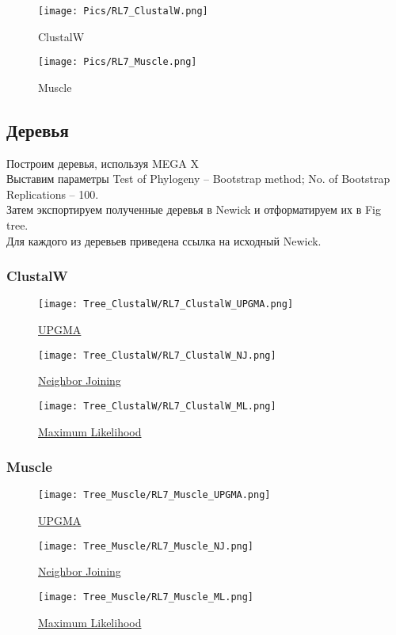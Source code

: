 \begin{figure}[!h]
	\texttt{[image: Pics/RL7\_ClustalW.png]}
	\caption{ClustalW}
\end{figure}

\begin{figure}[!h]
	\texttt{[image: Pics/RL7\_Muscle.png]}
	\caption{Muscle}
\end{figure}


\subsection*{Деревья}
Построим деревья, используя MEGA X\\
Выставим параметры Test of Phylogeny -- Bootstrap method; No. of Bootstrap Replications -- 100.\\
Затем экспортируем полученные деревья в Newick и отформатируем их в Fig tree.\\
Для каждого из деревьев приведена ссылка на исходный Newick.

\subsubsection*{ClustalW}
\begin{figure}[!h]
	\texttt{[image: Tree\_ClustalW/RL7\_ClustalW\_UPGMA.png]}
	\caption{\href{https://drive.google.com/file/d/1hPpDUa9uJmDLcnrepNsUhFL9HPq9cWZD/view?usp=sharing}{UPGMA}}
\end{figure}
\newpage
\begin{figure}[!h]
	\texttt{[image: Tree\_ClustalW/RL7\_ClustalW\_NJ.png]}
	\caption{\href{https://drive.google.com/file/d/1fIEN3s1rEiak2htmVUBiG3kB9EShOhEs/view?usp=sharing}{Neighbor Joining}}
\end{figure}
\begin{figure}[!h]
	\texttt{[image: Tree\_ClustalW/RL7\_ClustalW\_ML.png]}
	\caption{\href{https://drive.google.com/file/d/1OAH_Js0PMo2zVixTMYlEwZyR-ohE5Rn8/view?usp=sharing}{Maximum Likelihood}}
\end{figure}
\newpage
\subsubsection*{Muscle}

\begin{figure}[!h]
	\texttt{[image: Tree\_Muscle/RL7\_Muscle\_UPGMA.png]}
	\caption{\href{https://drive.google.com/file/d/11cxH8ehwfc-_q8jbqnSrhElHRs3Ktvhq/view?usp=sharing}{UPGMA}}
\end{figure}
\begin{figure}[!h]
	\texttt{[image: Tree\_Muscle/RL7\_Muscle\_NJ.png]}
	\caption{\href{https://drive.google.com/file/d/1wzBnoBK5oBEDgvbvZISxCxtlgAArmOFH/view?usp=sharing}{Neighbor Joining}}
\end{figure}
\newpage
\begin{figure}[!h]
	\texttt{[image: Tree\_Muscle/RL7\_Muscle\_ML.png]}
	\caption{\href{https://drive.google.com/file/d/1Mw3AzA7iSqX0yH_KnsdqV6_m5NO675vo/view?usp=sharing}{Maximum Likelihood}}
\end{figure}
\newpage


